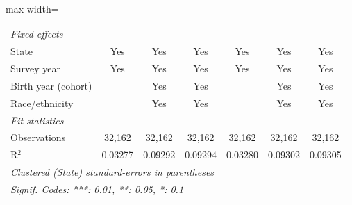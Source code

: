 \begin{adjustbox}{max width=\linewidth}
\begin{tabular}{lcccccc}
      \midrule
      \emph{Fixed-effects}\\
      State                                    & Yes           & Yes           & Yes           & Yes           & Yes           & Yes\\  
      Survey year                              & Yes           & Yes           & Yes           & Yes           & Yes           & Yes\\  
      Birth year (cohort)                      &               & Yes           & Yes           &               & Yes           & Yes\\  
      Race/ethnicity                           &               & Yes           & Yes           &               & Yes           & Yes\\  
      \midrule
      \emph{Fit statistics}\\
      Observations                             & 32,162        & 32,162        & 32,162        & 32,162        & 32,162        & 32,162\\  
      R$^2$                                    & 0.03277       & 0.09292       & 0.09294       & 0.03280       & 0.09302       & 0.09305\\  
      \midrule \midrule
      \multicolumn{7}{l}{\emph{Clustered (State) standard-errors in parentheses}}\\
      \multicolumn{7}{l}{\emph{Signif. Codes: ***: 0.01, **: 0.05, *: 0.1}}\\
   \end{tabular}
      \end{adjustbox}
\vspace{3pt}\par{}
